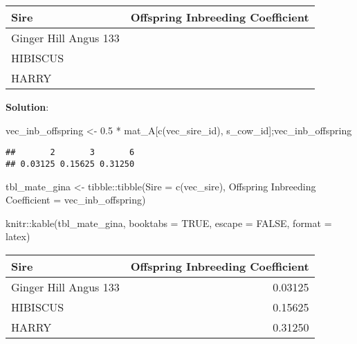 \documentclass[
]{article}
\newenvironment{Shaded}{\begin{snugshade}}{\end{snugshade}}
\newcommand{\AttributeTok}[1]{\textcolor[rgb]{0.77,0.63,0.00}{#1}}
\newcommand{\ConstantTok}[1]{\textcolor[rgb]{0.00,0.00,0.00}{#1}}
\newcommand{\FloatTok}[1]{\textcolor[rgb]{0.00,0.00,0.81}{#1}}
\newcommand{\FunctionTok}[1]{\textcolor[rgb]{0.00,0.00,0.00}{#1}}
\newcommand{\NormalTok}[1]{#1}
\newcommand{\OtherTok}[1]{\textcolor[rgb]{0.56,0.35,0.01}{#1}}
\newcommand{\SpecialCharTok}[1]{\textcolor[rgb]{0.00,0.00,0.00}{#1}}
\newcommand{\StringTok}[1]{\textcolor[rgb]{0.31,0.60,0.02}{#1}}
\newcommand{\solstart}
{\vspace{3ex}\textbf{Solution}:}
\begin{document}
\begin{tabular}{ll}
\toprule
Sire & Offspring Inbreeding Coefficient\\
\midrule
Ginger Hill Angus 133 & \\
HIBISCUS & \\
HARRY & \\
\bottomrule
\end{tabular}

\solstart

\begin{Shaded}
\begin{Highlighting}[]
\NormalTok{vec\_inb\_offspring }\OtherTok{\textless{}{-}} \FloatTok{0.5} \SpecialCharTok{*}\NormalTok{ mat\_A[}\FunctionTok{c}\NormalTok{(vec\_sire\_id), s\_cow\_id];vec\_inb\_offspring}
\end{Highlighting}
\end{Shaded}

\begin{verbatim}
##       2       3       6 
## 0.03125 0.15625 0.31250
\end{verbatim}

\begin{Shaded}
\begin{Highlighting}[]
\NormalTok{tbl\_mate\_gina }\OtherTok{\textless{}{-}}\NormalTok{ tibble}\SpecialCharTok{::}\FunctionTok{tibble}\NormalTok{(}\AttributeTok{Sire =} \FunctionTok{c}\NormalTok{(vec\_sire),}
                                \StringTok{\textasciigrave{}}\AttributeTok{Offspring Inbreeding Coefficient}\StringTok{\textasciigrave{}} \OtherTok{=}\NormalTok{ vec\_inb\_offspring)}

\NormalTok{knitr}\SpecialCharTok{::}\FunctionTok{kable}\NormalTok{(tbl\_mate\_gina,}
             \AttributeTok{booktabs =} \ConstantTok{TRUE}\NormalTok{,}
             \AttributeTok{escape =} \ConstantTok{FALSE}\NormalTok{,}
             \AttributeTok{format =} \StringTok{\textquotesingle{}latex\textquotesingle{}}\NormalTok{)                                }
\end{Highlighting}
\end{Shaded}

\begin{tabular}{lr}
\toprule
Sire & Offspring Inbreeding Coefficient\\
\midrule
Ginger Hill Angus 133 & 0.03125\\
HIBISCUS & 0.15625\\
HARRY & 0.31250\\
\bottomrule
\end{tabular}
\end{document}
